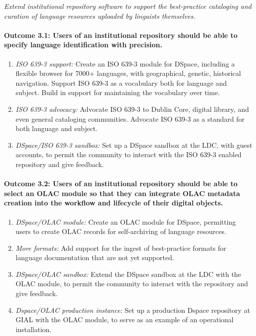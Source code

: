 \emph{Extend institutional repository software to support the best-practice
    cataloging and curation of language resources 
    uploaded by linguists themselves.}

\def\task{3.1}
\paragraph{Outcome {\task}: Users of an institutional repository should be able
  to specify language identification with precision.}

\begin{enumerate}[label=\emph{\task\alph*}]
\item \emph{ISO 639-3 support:}
  Create an ISO 639-3 module for DSpace, including a flexible
  browser for 7000+ languages, with geographical, genetic, historical
  navigation. Support ISO 639-3 as a vocabulary both for language and subject.
  Build in support for maintaining the vocabulary over time.
\item \emph{ISO 639-3 advocacy:}
  Advocate ISO 639-3 to Dublin Core, digital library, and even general cataloging
  communities. Advocate ISO 639-3 as a standard for both language and subject.
\item \emph{DSpace/ISO 639-3 sandbox:}
  Set up a DSpace sandbox at the LDC, with guest accounts,
  to permit the community to interact with the
  ISO 639-3 enabled repository and give feedback.
\end{enumerate}

\def\task{3.2}
\paragraph{Outcome {\task}: Users of an institutional repository should be
    able to select an OLAC module so that they can integrate OLAC
    metadata creation into the workflow and lifecycle of their
    digital objects.}

\begin{enumerate}[label=\emph{\task\alph*}]
\item \emph{DSpace/OLAC module:}
  Create an OLAC module for DSpace, permitting users to create OLAC
  records for self-archiving of language resources.
\item \emph{More formats:}
  Add support for the ingest of best-practice formats for language
  documentation that are not yet supported.
\item \emph{DSpace/OLAC sandbox:}
  Extend the DSpace sandbox at the LDC with the OLAC module,
  to permit the community to interact with the repository and give feedback.
\item \emph{Dspace/OLAC production instance:}
  Set up a production Dspace repository at GIAL with the OLAC module, to serve
  as an example of an operational installation. 
\end{enumerate}

